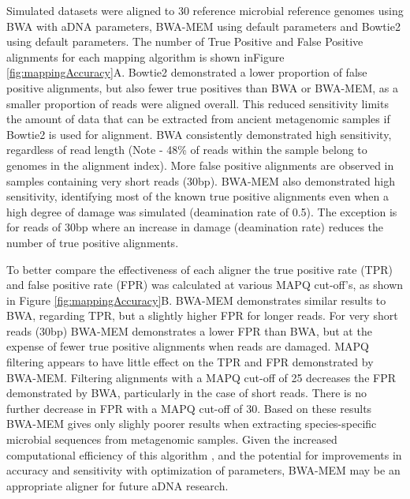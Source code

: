 \documentclass[12pt, a4paper]{article}
\begin{document}
Simulated datasets were aligned to 30 reference microbial reference genomes using BWA \cite{Li:2009aa} with aDNA parameters, BWA-MEM \cite{Li:2013} using default parameters and Bowtie2 \cite{Langmead:2012aa} using default parameters. 
The number of True Positive and False Positive alignments for each mapping algorithm is shown inFigure \ref{fig:mappingAccuracy}A. 
Bowtie2 demonstrated a lower proportion of false positive alignments, but also fewer true positives than BWA or BWA-MEM, as a smaller proportion of reads were aligned overall. 
This reduced sensitivity limits the amount of data that can be extracted from ancient metagenomic samples if Bowtie2 is used for alignment. BWA consistently demonstrated high sensitivity, regardless of read length (Note - 48\% of reads within the sample belong to genomes in the alignment index). More false positive alignments are observed in samples containing very short reads (30bp). 
BWA-MEM also demonstrated high sensitivity, identifying most of the known true positive alignments even when a high degree of damage was simulated (deamination rate of 0.5). 
The exception is for reads of 30bp where an increase in damage (deamination rate) reduces the number of true positive alignments. 

To better compare the effectiveness of each aligner the true positive rate (TPR) and false positive rate (FPR) was calculated at various MAPQ cut-off's, as shown in Figure \ref{fig:mappingAccuracy}B. 
BWA-MEM demonstrates similar results to BWA, regarding TPR, but a slightly higher FPR for longer reads. For very short reads (30bp) BWA-MEM demonstrates a lower FPR than BWA, but at the expense of fewer true positive alignments when reads are damaged. 
MAPQ filtering appears to have little effect on the TPR and FPR demonstrated by BWA-MEM. 
Filtering alignments with a MAPQ cut-off of 25 decreases the FPR demonstrated by BWA, particularly in the case of short reads.
There is no further decrease in FPR with a MAPQ cut-off of 30. 
Based on these results BWA-MEM gives only slighly poorer results when extracting species-specific microbial sequences from metagenomic samples.
Given the increased computational efficiency of this algorithm \cite{Li:2013}, and the potential for improvements in accuracy and sensitivity with optimization of parameters, BWA-MEM may be an appropriate aligner for future aDNA research. 
\end{document}
